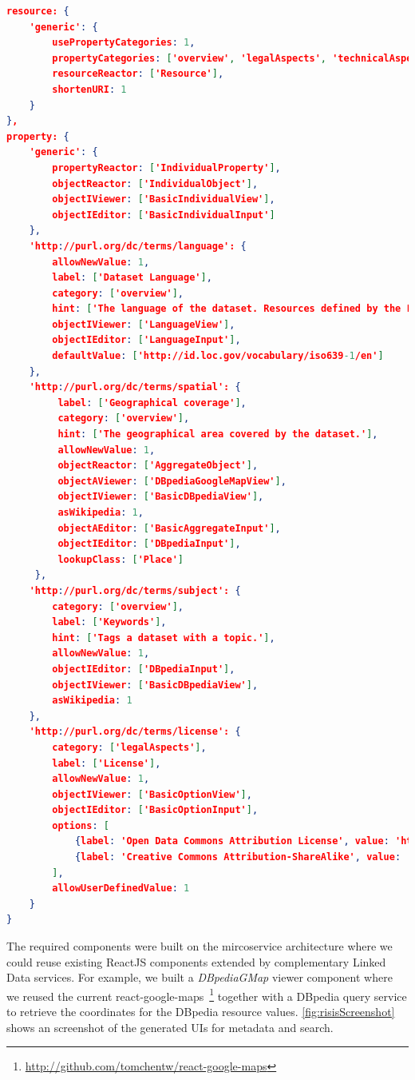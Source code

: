 \documentclass{acm_proc_article-sp}
\begin{document}
\begin{lstlisting}[language=json,firstnumber=1, label=code:config, caption=An excerpt of LD-R configs for RISIS.]
resource: {
    'generic': {
        usePropertyCategories: 1,
        propertyCategories: ['overview', 'legalAspects', 'technicalAspects'],
        resourceReactor: ['Resource'],
        shortenURI: 1
    }
},
property: {
    'generic': {
        propertyReactor: ['IndividualProperty'],
        objectReactor: ['IndividualObject'],
        objectIViewer: ['BasicIndividualView'],
        objectIEditor: ['BasicIndividualInput']
    },
    'http://purl.org/dc/terms/language': {
        allowNewValue: 1,
        label: ['Dataset Language'],
        category: ['overview'],
        hint: ['The language of the dataset. Resources defined by the Library of Congress (http://id.loc.gov/vocabulary/iso639-1.html, http://id.loc.gov/vocabulary/iso639-2.html) SHOULD be used.'],
        objectIViewer: ['LanguageView'],
        objectIEditor: ['LanguageInput'],
        defaultValue: ['http://id.loc.gov/vocabulary/iso639-1/en']
    },
    'http://purl.org/dc/terms/spatial': {
         label: ['Geographical coverage'],
         category: ['overview'],
         hint: ['The geographical area covered by the dataset.'],
         allowNewValue: 1,
         objectReactor: ['AggregateObject'],
         objectAViewer: ['DBpediaGoogleMapView'],
         objectIViewer: ['BasicDBpediaView'],
         asWikipedia: 1,
         objectAEditor: ['BasicAggregateInput'],
         objectIEditor: ['DBpediaInput'],
         lookupClass: ['Place']
     },
    'http://purl.org/dc/terms/subject': {
        category: ['overview'],
        label: ['Keywords'],
        hint: ['Tags a dataset with a topic.'],
        allowNewValue: 1,
        objectIEditor: ['DBpediaInput'],
        objectIViewer: ['BasicDBpediaView'],
        asWikipedia: 1
    },
    'http://purl.org/dc/terms/license': {
        category: ['legalAspects'],
        label: ['License'],
        allowNewValue: 1,
        objectIViewer: ['BasicOptionView'],
        objectIEditor: ['BasicOptionInput'],
        options: [
            {label: 'Open Data Commons Attribution License', value: 'http://www.opendatacommons.org/licenses/by/'},
            {label: 'Creative Commons Attribution-ShareAlike', value: 'http://creativecommons.org/licenses/by-sa/3.0/'}
        ],
        allowUserDefinedValue: 1
    }   
}
\end{lstlisting}

The required components were built on the mircoservice architecture where we could reuse existing ReactJS components extended by complementary Linked Data services.
For example, we built a \emph{DBpediaGMap} viewer component where we reused the current react-google-maps~\footnote{\url{http://github.com/tomchentw/react-google-maps}} together with a DBpedia query service to retrieve the coordinates for the DBpedia resource values.
\autoref{fig:risisScreenshot} shows an screenshot of the generated UIs for metadata and search.
\end{document}

